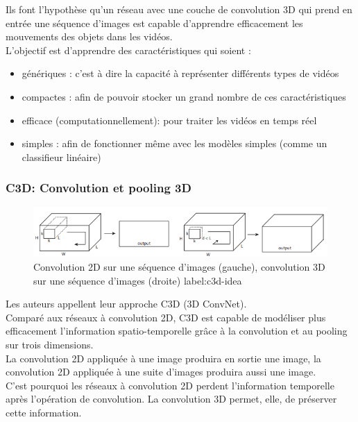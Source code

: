 \documentclass[11pt]{article}
\begin{document}
Ils font l'hypothèse qu'un réseau avec une couche de convolution 3D qui prend en entrée une séquence d'images est capable d'apprendre efficacement les mouvements des objets dans les vidéos.\\

L'objectif est d'apprendre des caractéristiques qui soient :\\
\begin{itemize}
\item génériques : c'est à dire la capacité à représenter différents types de vidéos\\
\item compactes : afin de pouvoir stocker un grand nombre de ces caractéristiques\\
\item efficace (computationnellement): pour traiter les vidéos en temps réel\\
\item simples : afin de fonctionner même avec les modèles simples (comme un classifieur linéaire)\\
\end{itemize}

\subsubsection{C3D: Convolution et pooling 3D}
\label{sec:orgd753fb0}
\begin{figure}[htbp]
\centering
\includegraphics[width=.9\linewidth]{c3d_idea.png}
\caption{Convolution 2D sur une séquence d'images (gauche), convolution 3D sur une séquence d'images (droite) label:c3d-idea}
\end{figure}
Les auteurs appellent leur approche C3D (3D ConvNet).\\
Comparé aux réseaux à convolution 2D, C3D est capable de modéliser plus efficacement l'information spatio-temporelle grâce à la convolution et au pooling sur trois dimensions.\\
La convolution 2D appliquée à une image produira en sortie une image, la convolution 2D appliquée à une suite d'images produira aussi une image.\\
C'est pourquoi les réseaux à convolution 2D perdent l'information temporelle après l'opération de convolution. La convolution 3D permet, elle, de préserver cette information.\\
\end{document}
